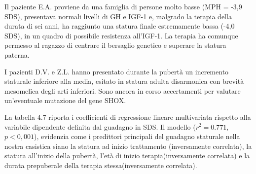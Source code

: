 Il paziente E.A. proviene da una famiglia di persone molto basse (MPH = -3,9 SDS), presentava normali livelli di GH e IGF-1 e, malgrado la terapia della durata di sei anni, ha raggiunto una statura finale estremamente bassa (-4,0 SDS), in un quadro di possibile resistenza all'IGF-1. La terapia ha comunque permesso al ragazzo di centrare il bersaglio genetico e superare la statura paterna.

I pazienti D.V. e Z.L. hanno presentato durante la pubertà un incremento staturale inferiore alla media, esitato in statura adulta disarmonica con brevità mesomelica degli arti inferiori. Sono ancora in corso accertamenti per valutare un'eventuale mutazione del gene SHOX. 

  


La tabella 4.7 riporta i coefficienti di regressione lineare multivariata rispetto alla variabile dipendente definita dal guadagno in SDS.
Il modello ($r^2 = 0.771$, $p < 0,001$), evidenzia come i predittori principali del guadagno staturale nella nostra casistica siano la statura ad inizio trattamento (inversamente correlata), la statura all'inizio della pubertà, l'età di inizio terapia(inversamente correlata) e la durata prepuberale della terapia stessa(inversamente correlata).

